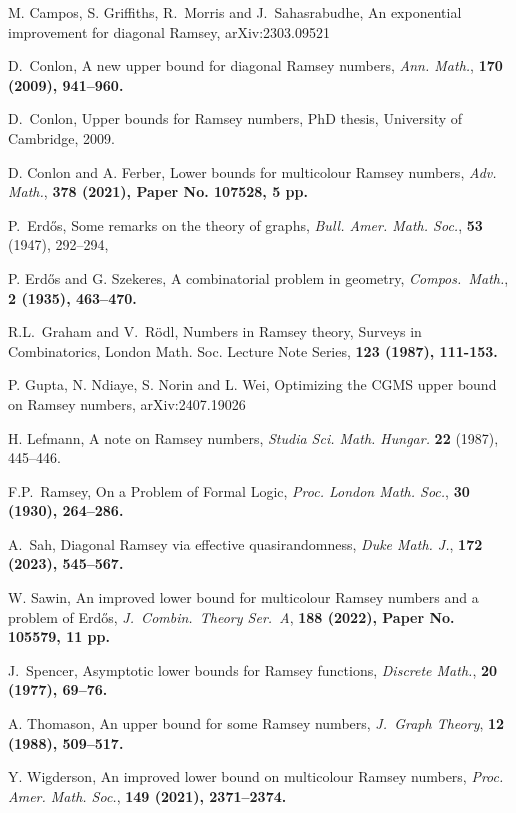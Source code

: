 \documentclass[12pt,reqno]{amsart}
\theoremstyle{definition}
\theoremstyle{remark}
\begin{document}
\begin{thebibliography}{9}

	 M. Campos, S. Griffiths, R.~Morris and J.~Sahasrabudhe,
	An exponential improvement for diagonal Ramsey, arXiv:2303.09521

	 D.~Conlon,
	A new upper bound for diagonal Ramsey numbers,
	\emph{Ann. Math.},  \bf 170 \rm (2009), 941--960.

	 D.~Conlon,
	Upper bounds for Ramsey numbers,
	PhD thesis, University of Cambridge, 2009.

	 D. Conlon and A. Ferber,
	Lower bounds for multicolour Ramsey numbers,
	\emph{Adv. Math.}, \bf 378 \rm (2021), Paper No. 107528, 5 pp.

	 P.~Erd\H{o}s,
	Some remarks on the theory of graphs,
	\emph{Bull. Amer. Math. Soc.}, \textbf{53} (1947), 292--294,

	 P. Erd\H{o}s and G. Szekeres,
	A combinatorial problem in geometry,
	\emph{Compos.~Math.}, \bf 2 \rm (1935), 463--470.

	 R.L.~Graham and V.~R\"odl,
	Numbers in Ramsey theory,
	Surveys in Combinatorics, London Math. Soc. Lecture Note Series, \bf 123 \rm (1987), 111-153.

	 P. Gupta, N. Ndiaye, S. Norin and L. Wei, Optimizing the CGMS upper bound on Ramsey numbers, arXiv:2407.19026

	 H. Lefmann, A note on Ramsey numbers,
	\emph{Studia Sci. Math. Hungar.} \textbf{22} (1987), 445--446.

	 F.P.~Ramsey,
	On a Problem of Formal Logic,
	\emph{Proc. London Math. Soc.}, \bf 30 \rm (1930), 264--286.

	 A.~Sah,
	Diagonal Ramsey via effective quasirandomness,
	\emph{Duke Math. J.}, \bf 172 \rm (2023), 545--567.

	 W. Sawin,
	An improved lower bound for multicolour Ramsey numbers and a problem of Erd\H{o}s,
	\emph{J.~Combin.~Theory Ser.~A}, \bf 188 \rm (2022), Paper No. 105579, 11 pp.

	 J.~Spencer,
	Asymptotic lower bounds for Ramsey functions,
	\emph{Discrete Math.}, \bf 20 \rm (1977), 69--76.

	 A. Thomason,
	An upper bound for some Ramsey numbers,
	\emph{J.~Graph Theory}, \bf 12 \rm (1988), 509--517.

	 Y. Wigderson,
	An improved lower bound on multicolour Ramsey numbers,
	\emph{Proc. Amer. Math. Soc.}, \bf 149 \rm (2021), 2371--2374.

\end{thebibliography}
\end{document}
